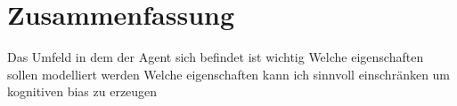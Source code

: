 \chapter{Zusammenfassung}
Das Umfeld in dem der Agent sich befindet ist wichtig
Welche eigenschaften sollen modelliert werden
Welche eigenschaften kann ich sinnvoll einschränken um kognitiven bias zu erzeugen